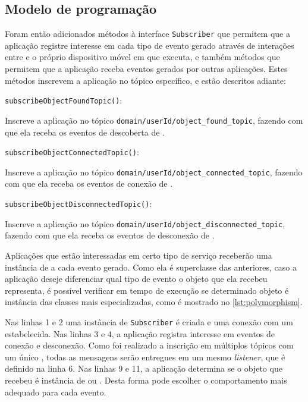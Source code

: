 \subsection{Modelo de programação}

Foram então adicionados métodos à interface \texttt{Subscriber} que permitem que a aplicação registre interesse em cada tipo de evento gerado através de interações entre \smartobjs e o próprio dispositivo móvel em que executa, e também métodos que permitem que a aplicação receba eventos gerados por outras aplicações. Estes métodos inscrevem a aplicação no tópico \mqtt específico, e estão descritos adiante:

\begin{alineas}
	\item \texttt{subscribeObjectFoundTopic()}:
	\begin{alineas}
		\item Inscreve a aplicação no tópico \texttt{domain/userId/object\_found\_topic}, fazendo com que ela receba os eventos de descoberta de \smartobjs.
	\end{alineas}

	\item \texttt{subscribeObjectConnectedTopic()}:
	\begin{alineas}
		\item Inscreve a aplicação no tópico \texttt{domain/userId/object\_connected\_topic}, fazendo com que ela receba os eventos de conexão de \smartobjs.
	\end{alineas}

	\item \texttt{subscribeObjectDisconnectedTopic()}:
	\begin{alineas}
		\item Inscreve a aplicação no tópico \texttt{domain/userId/object\_disconnected\_topic}, fazendo com que ela receba os eventos de desconexão de \smartobjs.
	\end{alineas}
\end{alineas}


Aplicações que estão interessadas em certo tipo de serviço receberão uma instância de \msg a cada evento gerado.
Como ela é superclasse das anteriores,
caso a aplicação deseje diferenciar qual tipo de evento o objeto \msg que ela recebeu representa, é possível verificar em tempo de execução se determinado objeto é instância das classes mais especializadas, como é mostrado no \autoref{lst:polymorphism}.



Nas linhas 1 e 2 uma instância de \texttt{Subscriber} é criada e uma conexão com um \broker estabelecida.
Nas linhas 3 e 4, a aplicação registra interesse em eventos de conexão e desconexão.
Como foi realizado a inscrição em múltiplos tópicos com um único \sub, todas as mensagens serão entregues em um mesmo \textit{listener}, que é definido na linha 6.
Nas linhas 9 e 11, a aplicação determina se o objeto que recebeu é instância de \objconnectedmsg ou \objdisconnectedmsg.
Desta forma pode escolher o comportamento mais adequado para cada evento.

